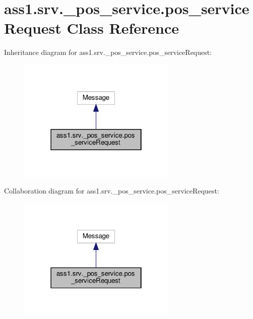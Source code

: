\hypertarget{classass1_1_1srv_1_1__pos__service_1_1pos__serviceRequest}{}\section{ass1.\+srv.\+\_\+pos\+\_\+service.\+pos\+\_\+service\+Request Class Reference}
\label{classass1_1_1srv_1_1__pos__service_1_1pos__serviceRequest}


Inheritance diagram for ass1.\+srv.\+\_\+pos\+\_\+service.\+pos\+\_\+service\+Request\+:
\nopagebreak
\begin{figure}[H]
\begin{center}
\leavevmode
\includegraphics[width=214pt]{classass1_1_1srv_1_1__pos__service_1_1pos__serviceRequest__inherit__graph}
\end{center}
\end{figure}


Collaboration diagram for ass1.\+srv.\+\_\+pos\+\_\+service.\+pos\+\_\+service\+Request\+:
\nopagebreak
\begin{figure}[H]
\begin{center}
\leavevmode
\includegraphics[width=214pt]{classass1_1_1srv_1_1__pos__service_1_1pos__serviceRequest__coll__graph}
\end{center}
\end{figure}
